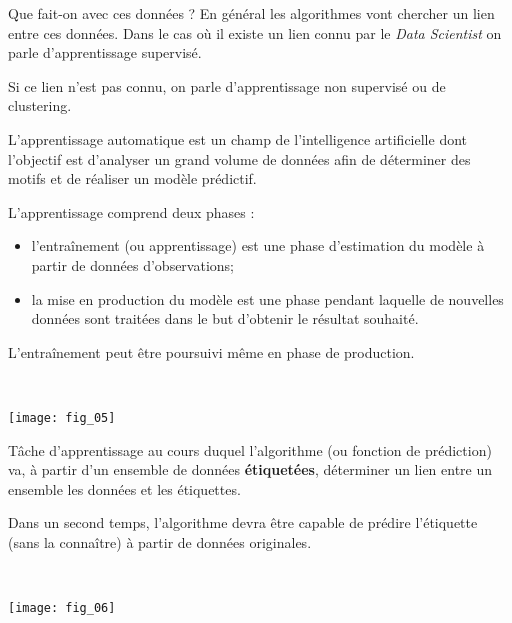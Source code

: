 Que fait-on avec ces données ? En général les algorithmes vont chercher un lien entre ces données. Dans le cas où il existe un lien connu par le \textit{Data Scientist} on parle d'apprentissage supervisé. 

Si ce lien n'est pas connu, on parle d'apprentissage non supervisé ou de clustering. 




\begin{defi}
L'apprentissage automatique est un champ de l'intelligence artificielle dont l'objectif est d'analyser un grand volume de
données afin de déterminer des motifs et de réaliser un modèle prédictif. 

L'apprentissage comprend deux phases : 
\begin{itemize}
\item l’entraînement (ou apprentissage) est une phase d'estimation du modèle à partir de données d'observations; 
\item la mise en production du modèle est une phase pendant laquelle de nouvelles données sont traitées dans le but d'obtenir le résultat souhaité. 
\end{itemize}

L’entraînement peut être poursuivi même en phase de production.

\end{defi}


\begin{exemple}~\\

\begin{center}
\texttt{[image: fig\_05]}
\end{center}
\end{exemple}


\begin{defi}
Tâche d'apprentissage au cours duquel l'algorithme (ou fonction de prédiction) va, à partir d'un ensemble de données \textbf{étiquetées}, déterminer un lien entre un ensemble les données et les étiquettes. 

Dans un second temps, l'algorithme devra être capable de prédire l'étiquette (sans la connaître) à partir de données originales.

\end{defi}



\begin{exemple}~\\

\begin{center}
\texttt{[image: fig\_06]}
\end{center}
\end{exemple}


